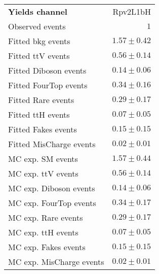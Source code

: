 

\begin{table}
\begin{center}
\setlength{\tabcolsep}{0.0pc}
{\small
\begin{tabular*}{\textwidth}{@{\extracolsep{\fill}}lr}
\noalign{\smallskip}\hline\noalign{\smallskip}
{\bfseries Yields channel}           & Rpv2L1bH              \\[-0.05cm]
\noalign{\smallskip}\hline\noalign{\smallskip}
Observed events          & $1$                    \\
\noalign{\smallskip}\hline\noalign{\smallskip}
Fitted bkg events         & $1.57 \pm 0.42$              \\
\noalign{\smallskip}\hline\noalign{\smallskip}
        Fitted ttV events         & $0.56 \pm 0.14$              \\
        Fitted Diboson events         & $0.14 \pm 0.06$              \\
        Fitted FourTop events         & $0.34 \pm 0.16$              \\
        Fitted Rare events         & $0.29 \pm 0.17$              \\
        Fitted ttH events         & $0.07 \pm 0.05$              \\
        Fitted Fakes events         & $0.15 \pm 0.15$              \\
        Fitted MisCharge events         & $0.02 \pm 0.01$              \\
 \noalign{\smallskip}\hline\noalign{\smallskip}
MC exp. SM events              & $1.57 \pm 0.44$              \\
\noalign{\smallskip}\hline\noalign{\smallskip}
        MC exp. ttV events         & $0.56 \pm 0.14$              \\
        MC exp. Diboson events         & $0.14 \pm 0.06$              \\
        MC exp. FourTop events         & $0.34 \pm 0.17$              \\
        MC exp. Rare events         & $0.29 \pm 0.17$              \\
        MC exp. ttH events         & $0.07 \pm 0.05$              \\
        MC exp. Fakes events         & $0.15 \pm 0.15$              \\
        MC exp. MisCharge events         & $0.02 \pm 0.01$              \\

\end{tabular*}}
\end{center}
\end{table}
